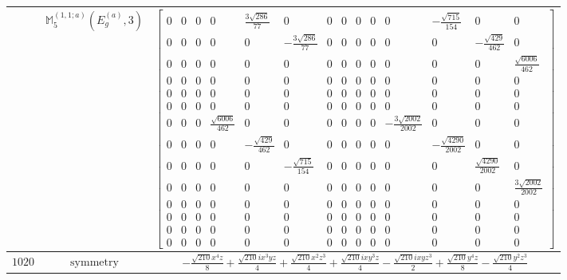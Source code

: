 \documentclass[fleqn,8pt,landscape]{jsarticle}
\begin{document}
\begin{longtable}{ccc}
$  $ & $ \mathbb{M}_{5}^{(1,1;a)}(E_{g}^{(a)},3) $ & $ \begin{bmatrix} 0 & 0 & 0 & 0 & \frac{3 \sqrt{286}}{77} & 0 & 0 & 0 & 0 & 0 & 0 & - \frac{\sqrt{715}}{154} & 0 & 0 \\ 0 & 0 & 0 & 0 & 0 & - \frac{3 \sqrt{286}}{77} & 0 & 0 & 0 & 0 & 0 & 0 & - \frac{\sqrt{429}}{462} & 0 \\ 0 & 0 & 0 & 0 & 0 & 0 & 0 & 0 & 0 & 0 & 0 & 0 & 0 & \frac{\sqrt{6006}}{462} \\ 0 & 0 & 0 & 0 & 0 & 0 & 0 & 0 & 0 & 0 & 0 & 0 & 0 & 0 \\ 0 & 0 & 0 & 0 & 0 & 0 & 0 & 0 & 0 & 0 & 0 & 0 & 0 & 0 \\ 0 & 0 & 0 & 0 & 0 & 0 & 0 & 0 & 0 & 0 & 0 & 0 & 0 & 0 \\ 0 & 0 & 0 & \frac{\sqrt{6006}}{462} & 0 & 0 & 0 & 0 & 0 & 0 & - \frac{3 \sqrt{2002}}{2002} & 0 & 0 & 0 \\ 0 & 0 & 0 & 0 & - \frac{\sqrt{429}}{462} & 0 & 0 & 0 & 0 & 0 & 0 & - \frac{\sqrt{4290}}{2002} & 0 & 0 \\ 0 & 0 & 0 & 0 & 0 & - \frac{\sqrt{715}}{154} & 0 & 0 & 0 & 0 & 0 & 0 & \frac{\sqrt{4290}}{2002} & 0 \\ 0 & 0 & 0 & 0 & 0 & 0 & 0 & 0 & 0 & 0 & 0 & 0 & 0 & \frac{3 \sqrt{2002}}{2002} \\ 0 & 0 & 0 & 0 & 0 & 0 & 0 & 0 & 0 & 0 & 0 & 0 & 0 & 0 \\ 0 & 0 & 0 & 0 & 0 & 0 & 0 & 0 & 0 & 0 & 0 & 0 & 0 & 0 \\ 0 & 0 & 0 & 0 & 0 & 0 & 0 & 0 & 0 & 0 & 0 & 0 & 0 & 0 \\ 0 & 0 & 0 & 0 & 0 & 0 & 0 & 0 & 0 & 0 & 0 & 0 & 0 & 0 \end{bmatrix} $ \\ \hline
$ 1020 $ & $ \text{symmetry} $ & $ - \frac{\sqrt{210} x^{4} z}{8} + \frac{\sqrt{210} i x^{3} y z}{4} + \frac{\sqrt{210} x^{2} z^{3}}{4} + \frac{\sqrt{210} i x y^{3} z}{4} - \frac{\sqrt{210} i x y z^{3}}{2} + \frac{\sqrt{210} y^{4} z}{8} - \frac{\sqrt{210} y^{2} z^{3}}{4} $ \\

\end{longtable}
\end{document}
